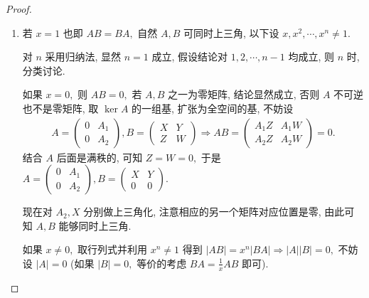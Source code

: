 \documentclass[../../main.tex]{subfiles}%
\begin{document}
\begin{proof}
\begin{enumerate}[(1)]
\item 若 \(x=1\) 也即 \(AB=BA,\) 自然 \(A, B\) 可同时上三角, 以下设 \(x, x^2, \cdots, x^n \ne 1.\)

对 \(n\) 采用归纳法, 显然 \(n=1\) 成立, 假设结论对 \(1, 2, \cdots, n-1\) 均成立, 则 \(n\) 时, 分类讨论.

如果 \(x=0,\) 则 \(AB=0,\) 若 \(A, B\) 之一为零矩阵, 结论显然成立, 否则 \(A\) 不可逆也不是零矩阵, 取 \(\ker A\) 的一组基, 扩张为全空间的基, 不妨设
\begin{align*}
A = \begin{pmatrix} 0 & A_1 \\ 0 & A_2 \end{pmatrix}, B = \begin{pmatrix} X & Y \\ Z & W \end{pmatrix} \Longrightarrow AB = \begin{pmatrix} A_1Z & A_1W \\ A_2Z & A_2W \end{pmatrix} = 0.
\end{align*}
结合 \(A\) 后面是满秩的, 可知 \(Z=W=0,\) 于是 \(A = \begin{pmatrix} 0 & A_1 \\ 0 & A_2 \end{pmatrix}, B = \begin{pmatrix} X & Y \\ 0 & 0 \end{pmatrix}.\)

现在对 \(A_2, X\) 分别做上三角化, 注意相应的另一个矩阵对应位置是零, 由此可知 \(A, B\) 能够同时上三角.

如果 \(x \ne 0,\) 取行列式并利用 \(x^n \ne 1\) 得到 \(|AB| = x^n |BA| \Longrightarrow |A||B|=0,\) 不妨设 \(|A|=0\) (如果 \(|B|=0,\) 等价的考虑 \(BA=\frac{1}{x}AB\) 即可).


\end{enumerate}
\end{proof}
\end{document}
